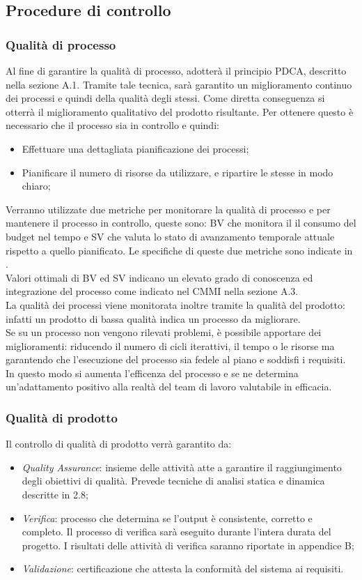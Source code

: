 \subsection{Procedure di controllo}
\subsubsection{Qualità di processo}
Al fine di garantire la qualità di processo, \gruppo{} adotterà il principio PDCA, descritto nella sezione A.1. Tramite tale tecnica, sarà  garantito un miglioramento continuo dei processi e quindi della qualità degli stessi. Come diretta conseguenza si otterrà il miglioramento qualitativo del prodotto risultante.
Per ottenere questo è necessario che il processo sia in controllo e quindi:
\begin{itemize}
\item Effettuare una dettagliata pianificazione dei processi;
\item Pianificare il numero di risorse da utilizzare, e ripartire le stesse in modo chiaro;
\end{itemize}
Verranno utilizzate due metriche per monitorare la qualità di processo e per mantenere il processo in controllo, queste sono: BV che monitora il il consumo del budget nel tempo e SV che valuta lo stato di avanzamento temporale attuale rispetto a quello pianificato. Le specifiche di queste due metriche sono indicate in \infoNDP. \\
Valori ottimali di BV ed SV indicano un elevato grado di conoscenza ed integrazione del processo come indicato nel CMMI nella sezione A.3.\\
La qualità dei processi viene monitorata inoltre tramite la qualità del prodotto: infatti un prodotto di bassa qualità indica un processo da migliorare.\\
Se su un processo non vengono rilevati problemi, è possibile apportare dei miglioramenti: riducendo il numero di cicli iterattivi, il tempo o le risorse ma garantendo che l'esecuzione del processo sia fedele al piano e soddisfi i requisiti. In questo modo si aumenta l'efficenza del processo e se ne determina un'adattamento positivo alla realtà del team di lavoro valutabile in efficacia.
\subsubsection{Qualità di prodotto}
Il controllo di qualità di prodotto verrà garantito da:
\begin{itemize}
\item \textit{Quality Assurance}: insieme delle attività atte a garantire il raggiungimento degli obiettivi di qualità. Prevede tecniche di analisi statica e dinamica descritte in 2.8;
\item \textit{Verifica}: processo che determina se l'output è consistente, corretto e completo. Il processo di verifica sarà eseguito durante l'intera durata del progetto. I risultati delle attività di verifica saranno riportate in appendice B;
\item \textit{Validazione}: certificazione che attesta la conformità del sistema ai requisiti.
\end{itemize}
